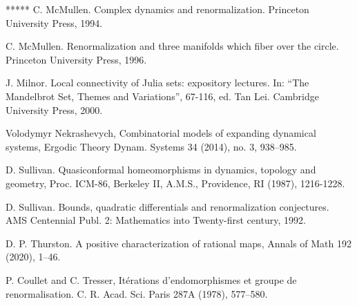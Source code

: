 \documentclass{amsart}
\newcommand{\1}{{\mathbb 1 }}
\begin{document}
\begin{thebibliography}{*****}
 C. McMullen. Complex dynamics and renormalization.
   Princeton University Press, 1994. 

 C. McMullen. Renormalization and three manifolds
  which fiber over the circle.   Princeton University Press, 1996. 
   
   
 J. Milnor.
     Local connectivity of Julia sets: expository lectures.
     In: ``The Mandelbrot Set, Themes and Variations'',  67-116, ed. Tan Lei.  
     Cambridge University Press, 2000.

 Volodymyr Nekrashevych, Combinatorial models of expanding dynamical systems, Ergodic Theory Dynam. Systems 34 (2014), no. 3, 938–985.


 D. Sullivan. Quasiconformal homeomorphisms in dynamics, topology and geometry, Proc. ICM-86, Berkeley II, A.M.S., Providence, RI (1987), 1216-1228.

  D. Sullivan. Bounds, quadratic differentials and renormalization conjectures.
  AMS Centennial Publ. 2: Mathematics into Twenty-first century, 1992.   


 D. P. Thurston. A positive characterization of rational maps, Annals of Math  192 (2020), 1--46.


   P. Coullet and C. Tresser, It\'erations d’endomorphismes et groupe de renormalisation. C. R. Acad. Sci. Paris 287A (1978), 577–580.





\end{thebibliography}
\end{document}

